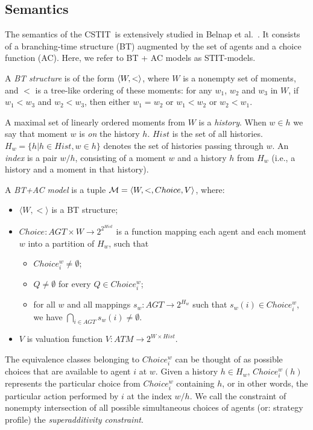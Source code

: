 \documentclass{article}
\newcommand{\atmset}{\ensuremath{\mathit{ATM}}}        \newcommand{\actset}{\ensuremath{\mathit{ACT}}}        \newcommand{\evtset}{\ensuremath{\mathit{EVT}}}
\newcommand{\agtset}{\ensuremath{\mathit{AGT}}}
\newcommand{\STIT} {{\textsf{STIT}}}              \newcommand{\CSTIT}{{\textsf{CSTIT}}}            \newcommand{\DSTIT}{{\textsf{DSTIT}}}
\begin{document}
\goodbreak
\subsection{Semantics}
The semantics of the \CSTIT\ is extensively studied in Belnap et al.\ \cite{belnap01facing}.
It consists of a branching-time structure (BT)
augmented by the set of agents and a choice function (AC).
Here, we refer to BT + AC models as \STIT-models.

A \emph{BT structure} is of the form $\langle W, <  \rangle$, where
$W$ is a nonempty set of moments, and
$<$ is a tree-like ordering of these moments: for any
$w_1$, $w_2$ and $w_3$ in $W$, if $w_1 < w_3$ and $w_2 < w_3$,
then either $w_1 = w_2$ or $w_1 < w_2$ or $w_2 < w_1$.

A maximal set of linearly ordered moments from $W$ is a \emph{history}.
When $w \in h$ we say that moment $w$ is \emph{on} the history $h$.
$Hist$ is the set of all histories.
$H_w = \{h | h \in Hist, w \in h\}$ denotes the set of histories passing through $w$.
An \emph{index} is a pair $w/h$, consisting of a moment $w$ and a
history $h$ from $H_w$ (i.e., a history and a moment in that history).

A \emph{BT+AC model} is a tuple $\mathcal{M} = \langle W,<,Choice,V \rangle$, where:
\begin{itemize}
\item $\langle W,<\rangle$ is a BT structure;

\item $Choice : \agtset \times W \rightarrow 2^{2^{Hist}}$
is a function mapping each agent and each moment $w$ into a partition of $H_w$,
such that
    \begin{itemize}
    \item $Choice_i^w \not = \emptyset$;
    \item $Q \not = \emptyset$ for every $Q \in Choice_i^w$;
    \item for all $w $ and all mappings $s_w : \agtset \longrightarrow 2^{H_w}$
          such that $s_w(i) \in Choice_i^w$,
          we have $\bigcap_{i\in \agtset} s_w(i) \not = \emptyset$.
    \end{itemize}

\item $V$ is valuation function $V : \atmset \rightarrow 2^{W \times Hist}$.
\end{itemize}
The equivalence classes belonging to $Choice_i^w$ can be thought of as possible choices
that are available to agent $i$ at $w$.
Given a history $h \in H_w$, $Choice_i^w(h)$ represents the particular choice
from $Choice_i^w$ containing $h$, or in other words, the particular action
performed by $i$ at the index $w/h$.
We call the constraint of nonempty intersection of all possible simultaneous choices of agents
(or: strategy profile) the \emph{superadditivity constraint}.
\end{document}
